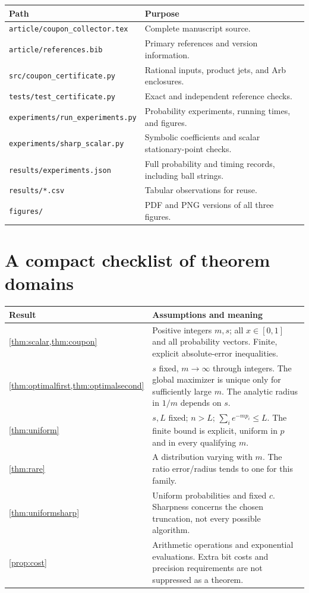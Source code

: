 \documentclass[11pt,a4paper]{article}
\theoremstyle{definition}
\begin{document}
\begin{longtable}{@{}p{}p{}@{}}
\toprule
Path & Purpose\\
\midrule
\endhead
\texttt{article/coupon\_collector.tex} & Complete manuscript source.\\
\texttt{article/references.bib} & Primary references and version information.\\
\texttt{src/coupon\_certificate.py} & Rational inputs, product jets, and Arb enclosures.\\
\texttt{tests/test\_certificate.py} & Exact and independent reference checks.\\
\texttt{experiments/run\_experiments.py} & Probability experiments, running times, and figures.\\
\texttt{experiments/sharp\_scalar.py} & Symbolic coefficients and scalar stationary-point checks.\\
\texttt{results/experiments.json} & Full probability and timing records, including ball strings.\\
\texttt{results/*.csv} & Tabular observations for reuse.\\
\texttt{figures/} & PDF and PNG versions of all three figures.\\
\bottomrule
\end{longtable}

\section{A compact checklist of theorem domains}\label{app:domains}

\begin{center}
\small
\begin{tabular}{@{}p{}p{}@{}}
\toprule
Result & Assumptions and meaning\\
\midrule
\cref{thm:scalar,thm:coupon}
& Positive integers $m,s$; all $x\in[0,1]$ and all probability vectors.
  Finite, explicit absolute-error inequalities.\\[3pt]
\cref{thm:optimalfirst,thm:optimalsecond}
& $s$ fixed, $m\to\infty$ through integers.
  The global maximizer is unique only for sufficiently large $m$.
  The analytic radius in $1/m$ depends on $s$.\\[3pt]
\cref{thm:uniform}
& $s,L$ fixed; $n>L$; $\sum_i e^{-mp_i}\le L$.
  The finite bound is explicit, uniform in $p$ and in every qualifying $m$.\\[3pt]
\cref{thm:rare}
& A distribution varying with $m$.
  The ratio error/radius tends to one for this family.\\[3pt]
\cref{thm:uniformsharp}
& Uniform probabilities and fixed $c$.
  Sharpness concerns the chosen truncation, not every possible algorithm.\\[3pt]
\cref{prop:cost}
& Arithmetic operations and exponential evaluations.
  Extra bit costs and precision requirements are not suppressed as a theorem.\\
\bottomrule
\end{tabular}
\end{center}
\end{document}
